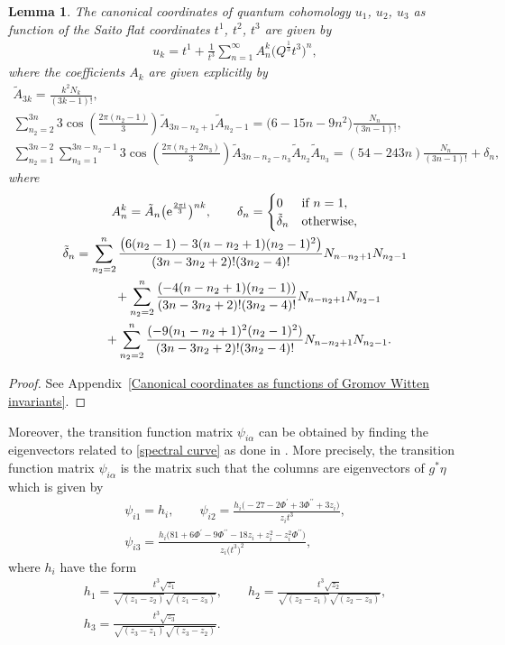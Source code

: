\documentclass[pdftex]{sigma}
\numberwithin{equation}{section}
\newtheorem{Lemma}[Theorem]{Lemma}
\begin{document}
\begin{Lemma}
The canonical coordinates of quantum cohomology $u_1$, $u_2$, $u_3$ as function of the Saito flat coordinates $t^1$, $t^2$, $t^3$ are given by
\begin{gather}\label{canonical coordinates lemma1}
u_k=t^1+\frac{1}{t^3}\sum_{n=1}^{\infty} A_n^k \bigl( Q^{\frac{1}{3}}t^3 \bigr)^n,
\end{gather}
where the coefficients $A_{k}$ are given explicitly by
\begin{gather*}
\tilde A_{3k}=\frac{k^2N_k}{(3k-1)! },\\
\sum_{n_2=2}^{3n}3\cos\left( \frac{2\pi (n_2-1)}{3}\right) \tilde A_{3n-n_2+1} \tilde A_{n_2-1}=\bigl(6-15n-9n^2 \bigr)\frac{N_n}{(3n-1)!},\\
\sum_{n_2=1}^{3n-2}\sum_{n_3=1}^{3n-n_2-1}3\cos\left( \frac{2\pi (n_2+2n_3 )}{3} \right) \tilde A_{3n-n_2-n_3} \tilde A_{n_2} \tilde A_{n_3}=(54-243n )\frac{N_n}{(3n-1)!}+\delta_{n} ,
\end{gather*}
where
\begin{gather*}
A_n^k=\tilde A_n \bigl( {\rm e}^{\frac{2\pi {\rm i}}{3}}\bigr)^{nk},
\qquad
\delta_n=
\begin{cases}
0& \text{if } n=1,\\
 \tilde\delta_n & \text{otherwise},
\end{cases}
\\
\tilde\delta_n=\sum_{n_2=2}^{n}\frac{\bigl(6(n_2-1)-3(n-n_2+1)(n_2-1)^2 \bigr)}{(3n-3n_2+2)!(3n_2-4)!} N_{n-n_2+1}N_{n_2-1}\\
\phantom{\tilde\delta_n=}{}+\sum_{n_2=2}^{n}\frac{(-4(n-n_2+1)(n_2-1) )}{(3n-3n_2+2)!(3n_2-4)!} N_{n-n_2+1}N_{n_2-1}\\
\phantom{\tilde\delta_n=}{}+\sum_{n_2=2}^{n}\frac{(-9(n_1-n_2+1)^2(n_2-1)^2 )}{(3n-3n_2+2)!(3n_2-4)!} N_{n-n_2+1}N_{n_2-1}.
\end{gather*}
\end{Lemma}

\begin{proof}
See Appendix~\ref{Canonical coordinates as functions of Gromov Witten invariants}.
\end{proof}

Moreover, the transition function matrix $\psi_{i \alpha}$ can be obtained by finding the eigenvectors related to \eqref{spectral curve} as done in \cite[Example 3.10.34]{B.Dubrovin4}. More precisely, the transition function matrix $\psi_{i \alpha}$ is the matrix such that the columns are eigenvectors of
$g^{*}\eta$
which is given by
\begin{gather*}
\psi_{i1}=h_i,\qquad
\psi_{i2}=\frac{h_i\bigl( -27-2\Phi^{\prime}+3\Phi^{\prime\prime} +3z_i \bigr)}{z_it^3},\\
\psi_{i3}=\frac{h_i\bigl( 81+6\Phi^{\prime}-9\Phi^{\prime\prime}-18z_i+z_i^2-z_i^2\Phi^{\prime\prime} \bigr)}{z_i\bigl(t^3\bigr)^2},
\end{gather*}
where $h_i$ have the form
\begin{gather*}
h_1=\frac{t^3\sqrt{z_1}}{\sqrt{(z_1-z_2)}\sqrt{(z_1-z_3)}}, \qquad h_2=\frac{t^3\sqrt{z_2}}{\sqrt{(z_2-z_1)}\sqrt{(z_2-z_3)}}, \\ h_3=\frac{t^3\sqrt{z_3}}{\sqrt{(z_3-z_1)}\sqrt{(z_3-z_2)}}.
\end{gather*}
\end{document}
